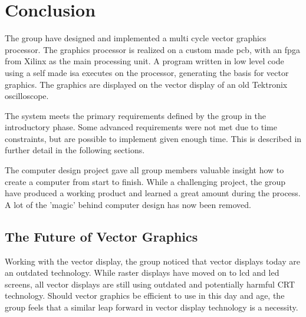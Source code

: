 \chapter{Conclusion}
The group have designed and implemented a multi cycle vector graphics processor.
The graphics processor is realized on a custom made \gls{pcb}, with an \gls{fpga} from Xilinx as the main processing unit.
A program written in low level code using a self made \gls{isa} executes on the processor, generating the basis for vector graphics.
The graphics are displayed on the vector display of an old Tektronix oscilloscope.

The system meets the primary requirements defined by the group in the introductory phase. 
Some advanced requirements were not met due to time constraints, but are possible to implement given enough time. 
This is described in further detail in the following sections.

The computer design project gave all group members valuable insight how to create a computer from start to finish.
While a challenging project, the group have produced a working product and learned a great amount during the process.
A lot of the 'magic' behind computer design has now been removed.

\section{The Future of Vector Graphics}
Working with the vector display, the group noticed that vector displays today are an outdated technology. 
While raster displays have moved on to \gls{lcd} and \gls{led} screens, all vector displays are still using outdated and potentially harmful CRT technology.
Should vector graphics be efficient to use in this day and age, the group feels that a similar leap forward in vector display technology is a necessity.